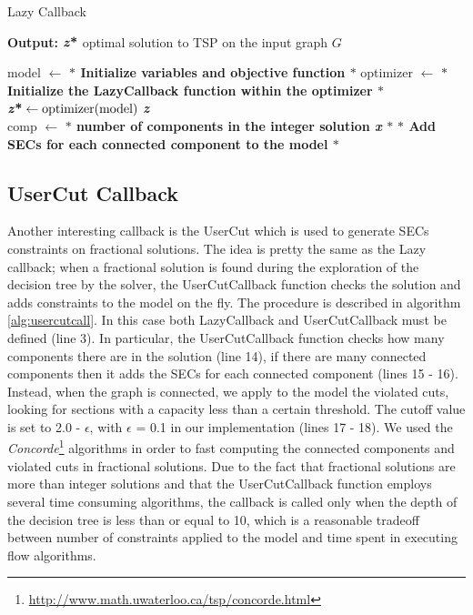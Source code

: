 \begin{algorithm}
    \caption{Lazy Callback}\label{Lazy Callback}
    \hspace*{\algorithmicindent} \textbf{Output:} $\textbf{\textit{z}\text{*}} $ optimal solution to TSP on the input graph $G$
    \begin{algorithmic}[1]
  \State model $ \leftarrow $ \textbf{$\ast$ Initialize variables and objective function $\ast$ }
  \State optimizer $ \leftarrow $ \textbf{$\ast$ Initialize the LazyCallback function within the optimizer $\ast$ }
  \State $\textbf{\textit{z}\text{*}} \gets \text{optimizer(model)}$
  \State \Return \textbf{\textit{z}\text{*}}
\EndFunction
\\
  \State comp $ \leftarrow $ \textbf{$\ast$ number of components in the integer solution \textit{x} $\ast$ }
	\State \textbf{ $\ast$ Add SECs for each connected component to the model $\ast$ }
	\EndIf  
	\State \Return 
	\EndFunction

    \end{algorithmic}
     \label{alg:lazycall}
    \end{algorithm}

\subsection{UserCut Callback}
Another interesting callback is the UserCut which is used to generate SECs constraints on fractional solutions. The idea is pretty the same as the Lazy callback; when a fractional solution is found during the exploration of the decision tree by the solver, the UserCutCallback function checks the solution and adds constraints to the model on the fly. The procedure is described in algorithm \ref{alg:usercutcall}. In this case both LazyCallback and UserCutCallback must be defined (line 3). In particular, the UserCutCallback function checks how many components there are in the solution (line 14), if there are many connected components then it adds the SECs for each connected component (lines 15 - 16). Instead, when the graph is connected, we apply to the model the violated cuts, looking for sections with a capacity less than a certain threshold. The cutoff value is set to 2.0 - $\epsilon$, with $\epsilon$ = 0.1 in our implementation (lines 17 - 18). We used the \textit{Concorde}\footnote{\url{http://www.math.uwaterloo.ca/tsp/concorde.html}} algorithms in order to fast computing the connected components and violated cuts in fractional solutions. Due to the fact that fractional solutions are more than integer solutions and that the UserCutCallback function employs several time consuming algorithms, the callback is called only when the depth of the decision tree is less than or equal to 10, which is a reasonable tradeoff between number of constraints applied to the model and time spent in executing flow algorithms.



